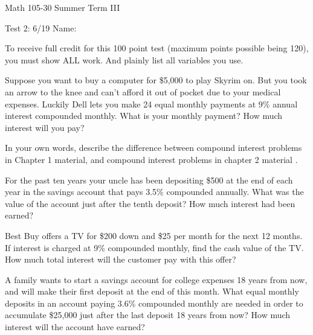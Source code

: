 \documentclass[11pt,epsfig]{article}
\begin{document}
Math 105-30 Summer Term III 

Test 2: 6/19 \hspace{1.9in} {Name:} {\underline {\hspace{3.5in}}}
\vspace{2pc}

To receive full credit for this 100 point test (maximum points possible being 120), you must show ALL work. And plainly list all variables you use.
\vspace{2pc}



\begin{problem}{12}
Suppose you want to buy a computer for \$5,000 to play Skyrim on. But you took an arrow to the knee and can't afford it out of pocket due to your medical expenses. Luckily Dell lets you make 24 equal monthly payments at 9\% annual interest compounded monthly. What is your monthly payment? How much interest will you pay?

\vfill
\end{problem}

\begin{problem}{12}
In your own words, describe the difference between compound interest problems in Chapter 1 material, and compound interest problems in chapter 2 material .

\vfill
\end{problem}

\begin{problem}{12}
For the past ten years your uncle has been depositing \$500 at the end of each year in the savings account that pays 3.5\% compounded annually. What was the value of the account just after the tenth deposit? How much interest had been earned?

\vfill
\end{problem}

\newpage

\begin{problem}{12}
Best Buy offers a TV for \$200 down and \$25 per month for the next 12 months. If interest is charged at 9\% compounded monthly, find the cash value of the TV. How much total interest will the customer pay with this offer?

\vfill
\end{problem}

\begin{problem}{12}
A family wants to start a savings account for college expenses 18 years from now, and will make their first deposit at the end of this month. What equal monthly deposits in an account paying 3.6\% compounded monthly are needed in order to accumulate \$25,000 just after the last deposit 18 years from now? How much interest will the account have earned?  

\vfill
\end{problem}
\end{document}
